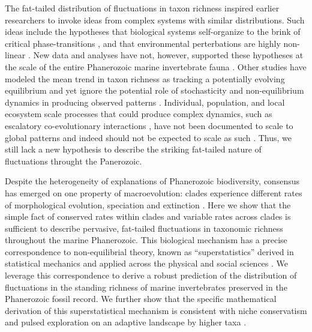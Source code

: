 \documentclass[12pt]{article}
\let\citep=\cite
\begin{document}
The fat-tailed distribution of fluctuations in taxon richness inspired earlier
researchers to invoke ideas from complex systems with similar
distributions. Such ideas include the hypotheses that biological
systems self-organize to the brink of critical phase-transitions
\citep{bak1993, sole1997}, and that environmental perterbations are
highly non-linear \citep{newman1995}. New data and analyses have not,
however, supported these hypotheses at the scale of the entire
Phanerozoic marine invertebrate fauna \citep{kirchner1998, alroy08}.
Other studies have modeled the mean trend in taxon richness as tracking a
potentially evolving equilibrium \citep{sepkoski1984, alroy2010,
  rabosky2009ecolLett, marshall2016} and yet ignore the potential role
of stochasticity and non-equilibrium dynamics in producing observed
patterns \citep{erwin2012, liow2007, quental2013, harmon2015,
  jordan2016}. Individual, population, and local ecosystem scale
processes that could produce complex dynamics, such as escalatory
co-evolutionary interactions \citep{vermeij1987}, have not been
documented to scale to global patterns \citep{madin2006} and indeed
should not be expected to scale as such \citep{vermeij2008}.  Thus, we
still lack a new hypothesis to describe the striking fat-tailed nature
of fluctuations throught the Panerozoic.


Despite the heterogeneity of explanations of Phanerozoic biodiversity,
consensus has emerged on one property of macroevolution: clades
experience different rates of morphological evolution, speciation and
extinction \citep{simpson1953, sepkoski1984, holman1989, gilinsky1994,
  stadler2011, rabosky2014}. Here we show that the simple fact of
conserved rates within clades and variable rates across clades is
sufficient to describe pervasive, fat-tailed fluctuations in taxonomic
richness throughout the marine Phanerozoic.  This biological mechanism
has a precise correspondence to non-equilibrial theory, known as
``superstatistics'' derived in statistical mechanics \citep{beck2003}
and applied across the physical and social sciences \citep{beck2004,
  fuentes2009}. We leverage this correspondence to derive a robust
prediction of the distribution of fluctuations in the standing
richness of marine invertebrates preserved in the Phanerozoic fossil
record. We further show that the specific mathematical derivation of
this superstatistical mechanism is consistent with niche conservatism
\citep{roy2009range, hopkins2014} and pulsed exploration on an
adaptive landscape by higher taxa \citep{eldredgeGould1972,
  newman1985adaptive, hopkins2014}.
\end{document}
